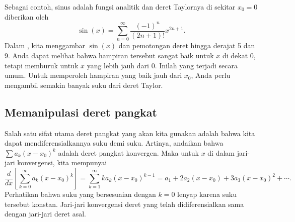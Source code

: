 Sebagai contoh, sinus adalah fungsi analitik dan deret Taylornya
di sekitar $x_0 = 0$
diberikan oleh
\begin{equation*}
\sin(x) = \sum_{n=0}^\infty \frac{{(-1)}^n}{(2n+1)!}
 x^{2n+1} .
\end{equation*}
Dalam , kita menggambar $\sin(x)$ dan pemotongan
deret hingga derajat 5 dan 9. Anda dapat melihat bahwa hampiran tersebut sangat
baik untuk $x$ di dekat 0, tetapi memburuk untuk $x$ yang lebih jauh dari 0. Inilah 
yang terjadi secara umum.
Untuk memperoleh hampiran yang baik jauh dari $x_0$, Anda
perlu mengambil semakin banyak suku dari deret Taylor.

\begin{myfig}
\capstart
{}
\caption{Fungsi sinus dan hampiran Taylornya
di sekitar $x_0=0$
berderajat $5^{\text{th}}$ dan $9^{\text{th}}$.\label{ps:sin}}
\end{myfig}

\subsection{Memanipulasi deret pangkat}

Salah satu sifat utama deret pangkat yang akan kita gunakan adalah
bahwa kita dapat mendiferensialkannya suku demi suku. Artinya,
andaikan bahwa 
$\sum a_k {(x-x_0)}^k$ adalah deret pangkat konvergen. Maka
untuk $x$ di dalam jari-jari konvergensi, kita mempunyai
\begin{equation*}
\frac{d}{dx}
\left[\sum_{k=0}^\infty a_k {(x-x_0)}^k\right]
=
\sum_{k=1}^\infty k a_k {(x-x_0)}^{k-1}
=
a_1
+ 2 a_2 (x-x_0)
+ 3 a_3 {(x-x_0)}^{2}
+ \cdots
.
\end{equation*}
Perhatikan bahwa suku yang bersesuaian dengan $k=0$ lenyap karena
suku tersebut konstan. Jari-jari konvergensi deret yang telah didiferensialkan
sama dengan jari-jari deret asal.

